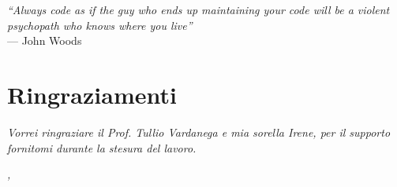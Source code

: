 
\cleardoublepage
{}
{}

\begin{flushright}{
	\slshape    
	``Always code as if the guy who ends up maintaining your code will be a violent psychopath who knows where you live''} \\ 
	\medskip
    --- John Woods
\end{flushright}

\bigskip

\begingroup
\let\clearpage\relax
\let\cleardoublepage\relax
\let\cleardoublepage\relax

\chapter*{Ringraziamenti}

\noindent \textit{Vorrei ringraziare il Prof. Tullio Vardanega e mia sorella Irene, per il supporto fornitomi durante la stesura del lavoro.}\\
\bigskip

\noindent\textit{\myLocation, \myTime}
\hfill \myName

\endgroup


